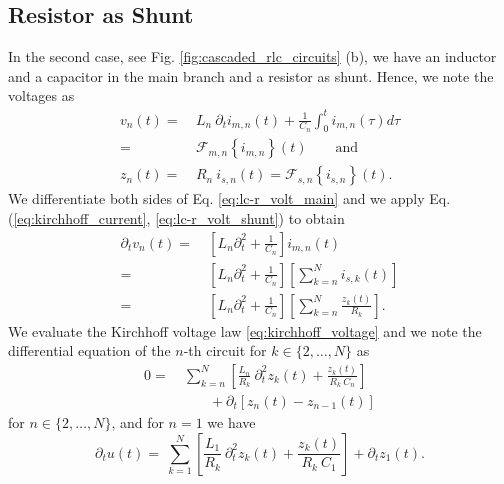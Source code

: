 \subsection{Resistor as Shunt}
In the second case, see Fig. \ref{fig:cascaded_rlc_circuits} (b), we have an inductor and a capacitor in the main branch and a resistor as shunt. Hence, we note the voltages as 
\begin{align} %
	v_{n}(t) =&~ L_n ~ \partial_{t} i_{m,n}(t) + \frac{1}{C_{n}} \int_{0}^{t} i_{m,n}(\tau) d\tau \nonumber \\
	=&~ \mathcal{F}_{m,n} \left\{i_{m,n}\right\}(t) \qquad\text{and} \label{eq:lc-r_volt_main} \\
	z_{n}(t) =&~ R_n ~ i_{s,n}(t)  = \mathcal{F}_{s,n} \left\{i_{s,n}\right\}(t) \text{.} \label{eq:lc-r_volt_shunt}
\end{align}
We differentiate both sides of Eq. \eqref{eq:lc-r_volt_main} and we apply Eq. (\ref{eq:kirchhoff_current}, \eqref{eq:lc-r_volt_shunt}) to obtain
\begin{align*}
	\partial_{t} v_{n}(t) =&~ \left[L_n \partial_{t}^2 + \frac{1}{C_{n}}\right] i_{m,n}(t) \\
	=&~ \left[L_n \partial_{t}^2 + \frac{1}{C_{n}}\right] \left[  \sum_{k=n}^{N} i_{s,k}(t)  \right] \\
	=&~ \left[L_n \partial_{t}^2 + \frac{1}{C_{n}}\right] \left[  \sum_{k=n}^{N} \frac{z_{k}(t)}{R_{k}} \right] \text{.}
\end{align*}
We evaluate the Kirchhoff voltage law \eqref{eq:kirchhoff_voltage} and we  note the differential equation of the $n$-th circuit 
for  $k\in\{2,\ldots,N\}$ as 
\begin{align}
	0 =&~ \sum_{k=n}^{N} \left[ \frac{L_{n}}{R_{k}} ~ \partial_{t}^2 z_{k}(t) + \frac{z_{k}(t)}{R_{k}~C_{n}} \right] \nonumber \\
	&\qquad   + \partial_{t} \left[z_{n}(t) - z_{n-1}(t)\right] \label{eq:lc-r_shunt_ode_n}
\end{align}
for $n\in\{2,\ldots,N\}$, and for $n=1$ we have
\begin{equation}
	\partial_{t} u(t) =~ \sum_{k=1}^{N} \left[ \frac{L_{1}}{R_{k}} ~ \partial_{t}^2 z_{k}(t) + \frac{z_{k}(t)}{R_{k}~C_{1}} \right] + \partial_{t} z_{1}(t) \text{.} \label{eq:lc-r_shunt_ode_0}
\end{equation}


